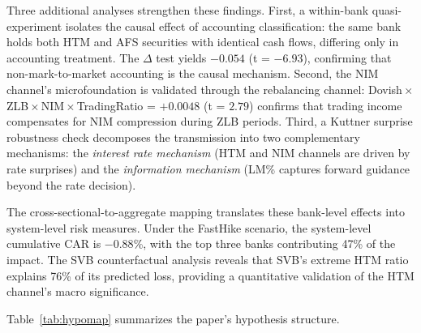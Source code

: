\documentclass[12pt,a4paper]{article}
\begin{document}
Three additional analyses strengthen these findings. First, a within-bank quasi-experiment isolates the causal effect of accounting classification: the same bank holds both HTM and AFS securities with identical cash flows, differing only in accounting treatment. The $\Delta$ test yields $-0.054$ (t = $-6.93$), confirming that non-mark-to-market accounting is the causal mechanism. Second, the NIM channel's microfoundation is validated through the rebalancing channel: Dovish\,$\times$\,ZLB\,$\times$\,NIM\,$\times$\,TradingRatio = $+0.0048$ (t = $2.79$) confirms that trading income compensates for NIM compression during ZLB periods. Third, a Kuttner surprise robustness check decomposes the transmission into two complementary mechanisms: the \textit{interest rate mechanism} (HTM and NIM channels are driven by rate surprises) and the \textit{information mechanism} (LM\% captures forward guidance beyond the rate decision).

The cross-sectional-to-aggregate mapping translates these bank-level effects into system-level risk measures. Under the FastHike scenario, the system-level cumulative CAR is $-0.88$\%, with the top three banks contributing 47\% of the impact. The SVB counterfactual analysis reveals that SVB's extreme HTM ratio explains 76\% of its predicted loss, providing a quantitative validation of the HTM channel's macro significance.

Table~\ref{tab:hypomap} summarizes the paper's hypothesis structure.
\end{document}
